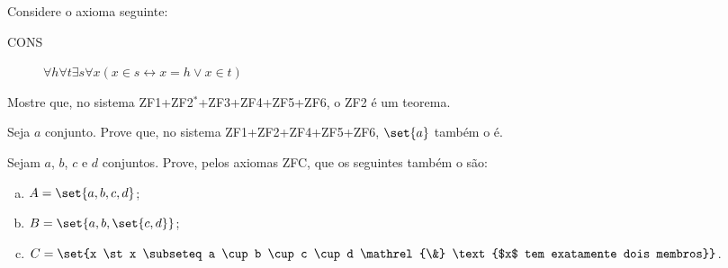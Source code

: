 \begin{exercise}
    Considere o axioma seguinte:
    \begin{description}
        \item[CONS] $\forall h \forall t \exists s \forall x (x \in s \leftrightarrow x=h \lor x \in t)$
    \end{description}
    Mostre que, no sistema ZF1+ZF2$^*$+ZF3+ZF4+ZF5+ZF6, o ZF2 é um teorema.
\end{exercise}

\begin{exercise}
    Seja $a$ conjunto. Prove que, no sistema ZF1+ZF2+ZF4+ZF5+ZF6, $\set{a}$ também o é.
\end{exercise}

\begin{exercise}
    Sejam $a$, $b$, $c$ e $d$ conjuntos. Prove, pelos axiomas ZFC, que os seguintes também o são:
    \begin{enumerate}[a)]
        \item $A = \set{a,b,c,d}$;
        \item $B = \set{a,b,\set{c,d}}$;
        \item $C = \set{x \st x \subseteq a \cup b \cup c \cup d \mathrel{\&} \text{$x$ tem exatamente dois membros}}$.
    \end{enumerate}
\end{exercise}